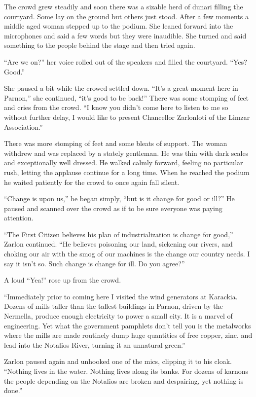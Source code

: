 The crowd grew steadily and soon there was a sizable herd of dunari filling the courtyard. Some
lay on the ground but others just stood. After a few moments a middle aged woman stepped up to
the podium. She leaned forward into the microphones and said a few words but they were
inaudible. She turned and said something to the people behind the stage and then tried again.

``Are we on?'' her voice rolled out of the speakers and filled the courtyard. ``Yes? Good.''

She paused a bit while the crowed settled down. ``It's a great moment here in Parnon,'' she
continued, ``it's good to be back!'' There was some stomping of feet and cries from the crowd.
``I know you didn't come here to listen to me so without further delay, I would like to present
Chancellor Zarlonloti of the Limzar Association.''

There was more stomping of feet and some bleats of support. The woman withdrew and was replaced
by a stately gentleman. He was thin with dark scales and exceptionally well dressed. He walked
calmly forward, feeling no particular rush, letting the applause continue for a long time. When
he reached the podium he waited patiently for the crowd to once again fall silent.

``Change is upon us,'' he began simply, ``but is it change for good or ill?'' He paused and
scanned over the crowd as if to be sure everyone was paying attention.

``The First Citizen believes his plan of industrialization is change for good,'' Zarlon
continued. ``He believes poisoning our land, sickening our rivers, and choking our air with the
smog of our machines is the change our country needs. I say it isn't so. Such change is change
for ill. Do you agree?''

A loud ``Yea!'' rose up from the crowd.

``Immediately prior to coming here I visited the wind generators at Karackia. Dozens of mills
taller than the tallest buildings in Parnon, driven by the Nermella, produce enough electricity
to power a small city. It is a marvel of engineering. Yet what the government pamphlets don't
tell you is the metalworks where the mills are made routinely dump huge quantities of free
copper, zinc, and lead into the Notalios River, turning it an unnatural green.''

Zarlon paused again and unhooked one of the mics, clipping it to his cloak. ``Nothing lives in
the water. Nothing lives along its banks. For dozens of karnons the people depending on the
Notalios are broken and despairing, yet nothing is done.''

